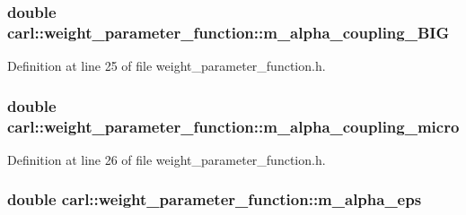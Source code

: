 \subsubsection[{m\+\_\+alpha\+\_\+coupling\+\_\+\+B\+I\+G}]{\setlength{\rightskip}{0pt plus 5cm}double carl\+::weight\+\_\+parameter\+\_\+function\+::m\+\_\+alpha\+\_\+coupling\+\_\+\+B\+I\+G\hspace{0.3cm}{\ttfamily [protected]}}\label{classcarl_1_1weight__parameter__function_a5addb5fcb856e919a1354362d1d48798}


Definition at line 25 of file weight\+\_\+parameter\+\_\+function.\+h.

\hypertarget{classcarl_1_1weight__parameter__function_adc7991f0d1c0ba1eeb4b371fd0d09fb0}{}
\subsubsection[{m\+\_\+alpha\+\_\+coupling\+\_\+micro}]{\setlength{\rightskip}{0pt plus 5cm}double carl\+::weight\+\_\+parameter\+\_\+function\+::m\+\_\+alpha\+\_\+coupling\+\_\+micro\hspace{0.3cm}{\ttfamily [protected]}}\label{classcarl_1_1weight__parameter__function_adc7991f0d1c0ba1eeb4b371fd0d09fb0}


Definition at line 26 of file weight\+\_\+parameter\+\_\+function.\+h.

\hypertarget{classcarl_1_1weight__parameter__function_aa5748118c244c8b2913f7ac656633957}{}
\subsubsection[{m\+\_\+alpha\+\_\+eps}]{\setlength{\rightskip}{0pt plus 5cm}double carl\+::weight\+\_\+parameter\+\_\+function\+::m\+\_\+alpha\+\_\+eps\hspace{0.3cm}{\ttfamily [protected]}}\label{classcarl_1_1weight__parameter__function_aa5748118c244c8b2913f7ac656633957}



